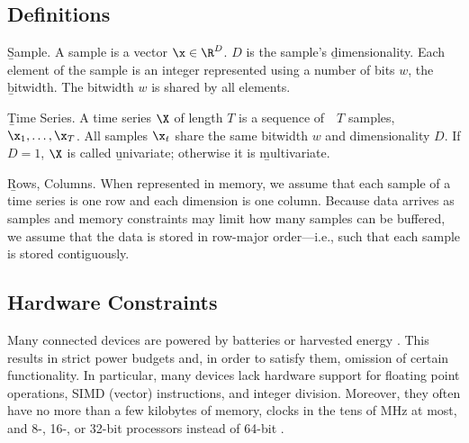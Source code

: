 \subsection{Definitions}
\begin{Definition} \b{Sample.} A sample is a vector $\x \in \R^D$. $D$ is the sample's \b{dimensionality}. Each element of the sample is an integer represented using a number of bits $w$, the \b{bitwidth}. The bitwidth $w$ is shared by all elements.
\end{Definition}
\begin{Definition} \b{Time Series.} A time series $\X$ of length $T$ is a sequence of $\text{ }T$ samples, $\x_1,\ldots,\x_T$. All samples $\x_t$ share the same bitwidth $w$ and dimensionality $D$. If $D = 1$, $\X$ is called \b{univariate}; otherwise it is \b{multivariate}.
\end{Definition}
\begin{Definition} \b{Rows, Columns.} When represented in memory, we assume that each sample of a time series is one row and each dimension is one column. Because data arrives as samples and memory constraints may limit how many samples can be buffered, we assume that the data is stored in row-major order---i.e., such that each sample is stored contiguously.
\end{Definition}

\subsection{Hardware Constraints}

Many connected devices are powered by batteries or harvested energy \cite{bsnChallenges}. This results in strict power budgets and, in order to satisfy them, omission of certain functionality. In particular, many devices lack hardware support for floating point operations, SIMD (vector) instructions, and integer division. Moreover, they often have no more than a few kilobytes of memory, clocks in the tens of MHz at most, and 8-, 16-, or 32-bit processors instead of 64-bit \cite{cc2540, cc2640, quark}.

